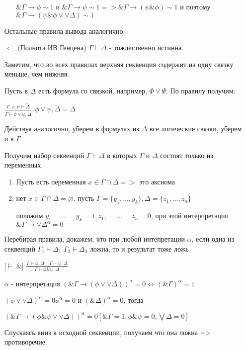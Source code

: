 \documentclass[a4paper]{article}
\theoremstyle{definition}
\theoremstyle{remark}
\begin{document}
\begin{itemize}
\begin{enumerate}
            $\& \Gamma \to \phi \sim 1$ и $\& \Gamma \to \psi \sim 1 => \& \Gamma \to (\psi\&\phi)\sim 1$ и поэтому $\& \Gamma \to (\psi\&\phi\vee \vee\Delta)\sim 1$
        \end{enumerate}
        Остальные правила вывода аналогично.
        \item[$\Leftarrow$] (Полнота ИВ Генцена)
        $\Gamma \vdash \Delta$ - тождественно истинна.

        Заметим, что во всех правилах верхняя секвенция содержит на одну связку меньше, чем нижняя.

        Пусть в $\Delta$ есть формула со связкой, например, $\Phi\vee \Psi$. По правилу получим:

        $\frac{\Gamma, \phi, \psi\vdash \widetilde{\Delta} }{\Gamma \vdash \phi\vee\psi,  \widetilde{\Delta}}, \phi\vee\psi, \widetilde{\Delta} = \Delta$

        Действуя аналогично, уберем в формулах из $\Delta $ все логические связки, уберем и в $\Gamma$

        Получим набор секвенций $\Gamma \vdash \Delta$ в которых $\Gamma$ и $\Delta$ состоят только из переменных.
        \begin{enumerate}
            \item Пусть есть переменная $x \in \Gamma \cap \Delta=>$ это аксиома
            \item нет $x \in \Gamma \cap \Delta=\varnothing$, пусть
            $\Gamma = \{ y_1, \dots, y_k \}, \Delta = \{ z_1, \dots, z_n \}$

            положим $y_1 = \dots = y_k = 1, z_1, = \dots = z_n = 0$, при этой интерпретации $\&\Gamma \to \vee\Delta^\alpha = 0$
        \end{enumerate}
        Перебирая правила, докажем, что при любой интепретации $\alpha$, если одна из 
        секвенций $\Gamma_1 \vdash \Delta_1$ $\Gamma_2 \vdash \Delta_2$ ложна, то и результат тоже ложь

        [$\vdash\;\&$] $\frac{\Gamma \vdash \phi, \Delta \quad \Gamma \vdash \psi, \Delta}{\Gamma \vdash \phi\&\psi, \Delta}$

        $\alpha$ - интерпретация $(\& \Gamma \to (\phi \vee \vee \Delta ))^\alpha = 0\Leftrightarrow (\& \Gamma)^\alpha = 1$

        $(\phi\vee \vee \Delta)^\alpha = 0$$\phi^\alpha = 0$ и $(\& \Delta)^\alpha = 0$, тогда 

        $(\& \Gamma \to (\phi\&\psi \vee \vee\Delta))^\alpha = 0 [\& \Gamma=1, \phi\&\psi = 0, \bigvee\Delta = 0]$ 

        Спускаясь вниз к исходной секвенции, получаем что она ложна => противоречие.
    \end{itemize}
\end{document}
